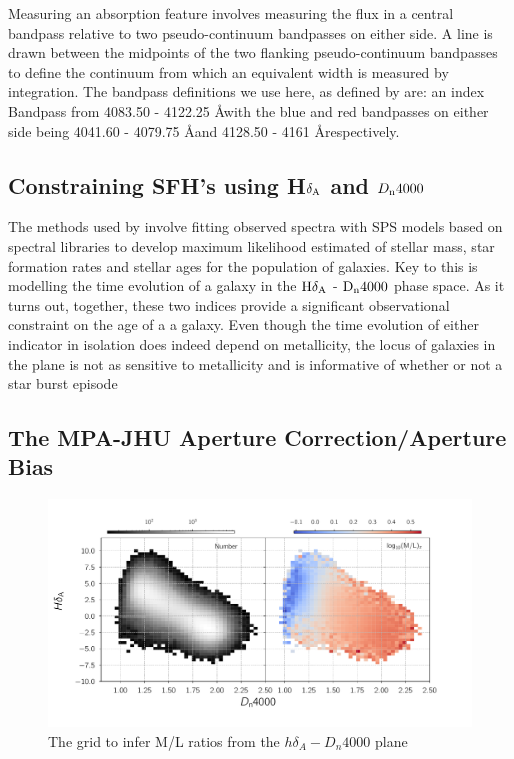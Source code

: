 Measuring an absorption feature involves measuring the flux in a central bandpass relative to two pseudo-continuum bandpasses on either side. A line is drawn between the midpoints of the two flanking pseudo-continuum bandpasses to define the continuum from which an equivalent width is measured by integration. The bandpass definitions we use here, as defined by \citet{worthey_comprehensive_1994} are: an index Bandpass from 4083.50 - 4122.25 \AA with the blue and red bandpasses on either side being 4041.60 - 4079.75 \AA and 4128.50 - 4161 \AA respectively.

\subsection{Constraining SFH's using H$\delta_{\rm A}$ and $D_{\rm n}4000$}
\label{kauffmann method}

The methods used by \citep{kauffmann} involve fitting observed spectra with SPS models based on spectral libraries to develop maximum likelihood estimated of stellar mass, star formation rates and stellar ages for the population of galaxies. Key to this is modelling the time evolution of a galaxy in the ${\rm H}\delta_{\rm A}$ - ${\rm D}_{\rm n} 4000$ phase space. As it turns out, together, these two indices provide a significant observational constraint on the age of a a galaxy. Even though the time evolution of either indicator in isolation does indeed depend on metallicity, the locus of galaxies in the plane is not as sensitive to metallicity and is informative of whether or not a star burst episode

\subsection{The MPA-JHU Aperture Correction/Aperture Bias}
\label{apercorr}


\begin{figure}
\includegraphics[width=\textwidth]{figures/hd_d4000_mlratio_coarser_binning.pdf}
\caption[The \citet{kauffmann_stellar_2003} grid to infer M/L ratios from the $h\delta_{A}-D_{n}4000$ plane]
{The \citet{kauffmann_stellar_2003} grid to infer M/L ratios from the $h\delta_{A}-D_{n}4000$ plane
\label{fig:kauff_grid}}
\end{figure}



